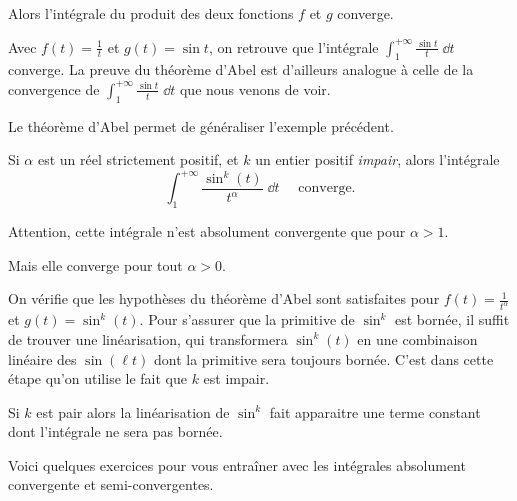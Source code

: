 Alors l'intégrale du produit des deux fonctions $f$ et $g$ converge.

Avec $f(t)=\frac1t$ et $g(t)=\sin t$, on retrouve que 
l'intégrale $\displaystyle \int_1^{+\infty} \frac{\sin t }{t}\;\dd t$ converge.
La preuve du théorème d'Abel est d'ailleurs analogue à celle de la convergence 
de $\displaystyle \int_1^{+\infty} \frac{\sin t }{t}\;\dd t$ 
que nous venons de voir.

\change

Le théorème d'Abel permet de généraliser l'exemple précédent.

Si $\alpha$ est un réel strictement
positif, et $k$ un entier positif \emph{impair}, alors l'intégrale 
$$
\int_1^{+\infty} \frac{\sin^k(t)}{t^\alpha}\;\dd t\quad\text{ converge.}
$$


Attention, cette intégrale n'est absolument convergente que 
pour $\alpha>1$. 

Mais elle converge pour tout $\alpha>0$.

\change
On vérifie que les hypothèses du théorème d'Abel sont
satisfaites pour $f(t) = \frac{1}{t^\alpha}$ et $g(t)=\sin^k(t)$. Pour
s'assurer que la primitive de $\sin^k$ est bornée, il suffit de
trouver une linéarisation, qui transformera $\sin^k(t)$ en une
combinaison linéaire des $\sin(\ell t)$ dont la
primitive sera toujours bornée. 
C'est dans cette étape qu'on utilise le fait que $k$ est impair.

Si $k$ est pair alors la linéarisation de $\sin^k$ fait apparaitre une terme constant
dont l'intégrale ne sera pas bornée.



\diapo

Voici quelques exercices pour vous entraîner avec 
les intégrales absolument convergente et semi-convergentes.


